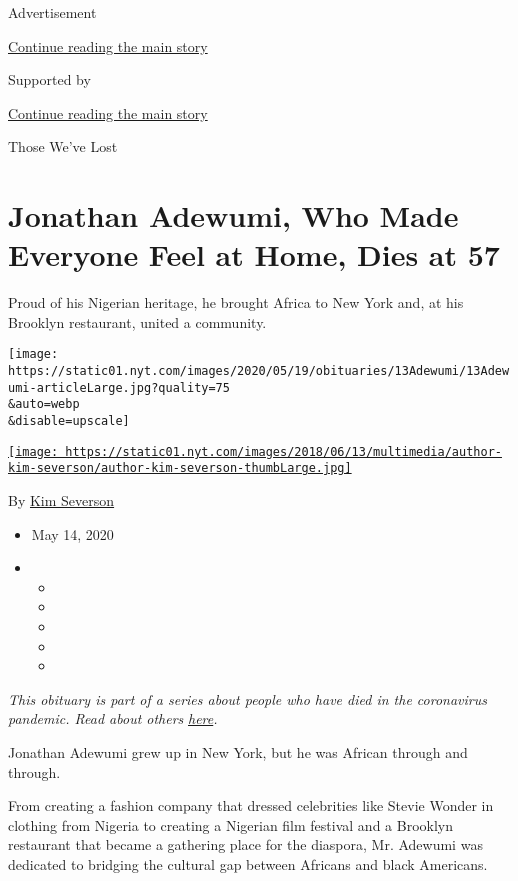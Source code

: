 Advertisement

\protect\hyperlink{after-top}{Continue reading the main story}

Supported by

\protect\hyperlink{after-sponsor}{Continue reading the main story}

Those We've Lost

\hypertarget{jonathan-adewumi-who-made-everyone-feel-at-home-dies-at-57}{%
\section{Jonathan Adewumi, Who Made Everyone Feel at Home, Dies at
57}\label{jonathan-adewumi-who-made-everyone-feel-at-home-dies-at-57}}

Proud of his Nigerian heritage, he brought Africa to New York and, at
his Brooklyn restaurant, united a community.

\texttt{[image: https://static01.nyt.com/images/2020/05/19/obituaries/13Adewumi/13Adewumi-articleLarge.jpg?quality=75\\\&auto=webp\\\&disable=upscale]}

\href{https://www.nytimes.com/by/kim-severson}{\texttt{[image: https://static01.nyt.com/images/2018/06/13/multimedia/author-kim-severson/author-kim-severson-thumbLarge.jpg]}}

By \href{https://www.nytimes.com/by/kim-severson}{Kim Severson}

\begin{itemize}
\item
  May 14, 2020
\item
  \begin{itemize}
  \item
  \item
  \item
  \item
  \item
  \end{itemize}
\end{itemize}

\emph{This obituary is part of a series about people who have died in
the coronavirus pandemic. Read about others}
\href{https://www.nytimes.com/series/people-who-have-died-of-the-coronavirus}{\emph{here}}\emph{.}

Jonathan Adewumi grew up in New York, but he was African through and
through.

From creating a fashion company that dressed celebrities like Stevie
Wonder in clothing from Nigeria to creating a Nigerian film festival and
a Brooklyn restaurant that became a gathering place for the diaspora,
Mr. Adewumi was dedicated to bridging the cultural gap between Africans
and black Americans.

